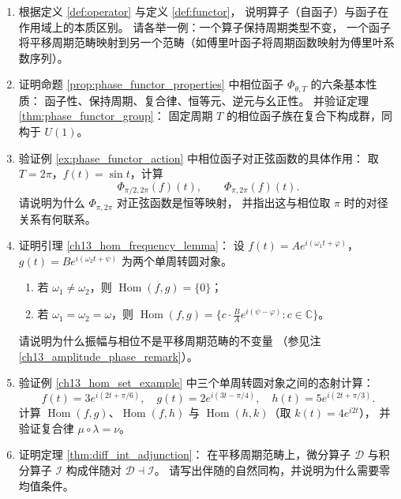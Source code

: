 \begin{enumerate}[leftmargin=3em, label=\textbf{题 \arabic*}]
    \item 根据定义 \ref{def:operator} 与定义 \ref{def:functor}，
    说明算子（自函子）与函子在作用域上的本质区别。
    请各举一例：一个算子保持周期类型不变，
    一个函子将平移周期范畴映射到另一个范畴（如傅里叶函子将周期函数映射为傅里叶系数序列）。

    \item 证明命题 \ref{prop:phase_functor_properties} 中相位函子
    $\Phi_{\theta,T}$ 的六条基本性质：
    函子性、保持周期、复合律、恒等元、逆元与幺正性。
    并验证定理 \ref{thm:phase_functor_group}：
    固定周期 $T$ 的相位函子族在复合下构成群，同构于 $U(1)$。

    \item 验证例 \ref{ex:phase_functor_action} 中相位函子对正弦函数的具体作用：
    取 $T=2\pi$，$f(t)=\sin t$，计算
    \[
    \Phi_{\pi/2,2\pi}(f)(t),\qquad
    \Phi_{\pi,2\pi}(f)(t).
    \]
    请说明为什么 $\Phi_{\pi,2\pi}$ 对正弦函数是恒等映射，
    并指出这与相位取 $\pi$ 时的对径关系有何联系。

    \item 证明引理 \ref{ch13_hom_frequency_lemma}：
    设 $f(t)=Ae^{i(\omega_1t+\varphi)}$，$g(t)=Be^{i(\omega_2t+\psi)}$ 为两个单周转圆对象。
    \begin{enumerate}[label=(\roman*)]
        \item 若 $\omega_1\neq\omega_2$，则 $\operatorname{Hom}(f,g)=\{0\}$；
        \item 若 $\omega_1=\omega_2=\omega$，则
              $\operatorname{Hom}(f,g)=\{c\cdot\frac{B}{A}e^{i(\psi-\varphi)}:c\in\mathbb{C}\}$。
    \end{enumerate}
    请说明为什么振幅与相位不是平移周期范畴的不变量
    （参见注 \ref{ch13_amplitude_phase_remark}）。

    \item 验证例 \ref{ch13_hom_set_example} 中三个单周转圆对象之间的态射计算：
    \[
    f(t)=3e^{i(2t+\pi/6)},\quad
    g(t)=2e^{i(3t-\pi/4)},\quad
    h(t)=5e^{i(2t+\pi/3)}.
    \]
    计算 $\operatorname{Hom}(f,g)$、$\operatorname{Hom}(f,h)$ 与 $\operatorname{Hom}(h,k)$（取 $k(t)=4e^{i2t}$），
    并验证复合律 $\mu\circ\lambda=\nu$。

    \item 证明定理 \ref{thm:diff_int_adjunction}：
    在平移周期范畴上，微分算子 $\mathcal{D}$ 与积分算子 $\mathcal{I}$
    构成伴随对 $\mathcal{D}\dashv\mathcal{I}$。
    请写出伴随的自然同构，并说明为什么需要零均值条件。


\end{enumerate}
